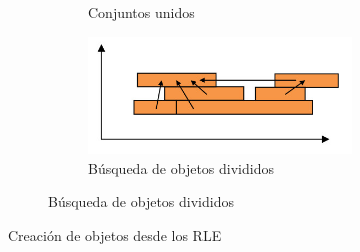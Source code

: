 \begin{figure}
\begin{subfigure}{\linewidth}
\begin{subfigure}{0.4\linewidth}
   			\caption{Conjuntos unidos}
   			\label{fig:RLE3}
   		\end{subfigure}
   		\begin{subfigure}{0.4\linewidth}
   			\includegraphics[width=\linewidth]{../Images/c2/RLE4}
   			\caption{B\'usqueda de objetos divididos}
   			\label{fig:RLE4}
   		\end{subfigure}
	\end{subfigure}
	\caption{Creaci\'on de objetos desde los RLE}
\end{figure}
